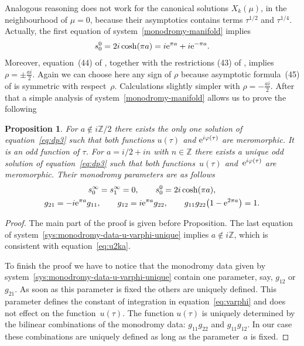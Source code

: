\documentclass[pdftex]{sigma}
\numberwithin{equation}{section}
\newtheorem{Proposition}[Theorem]{Proposition}
 { \theoremstyle{definition}
\newtheorem{Remark}[Theorem]{Remark} }
\begin{document}
Analogous reasoning does not work for the canonical solutions $X_k(\mu)$, in the neighbourhood of $\mu=0$,
because their asymptotics contains terms $\tau^{1/2}$ and $\tau^{1/4}$. Actually, the first equation of
system~\eqref{monodromy-manifold} implies
\begin{gather*}
s_0^0=2i\cosh(\pi a)=i{\rm e}^{\pi a}+i{\rm e}^{-\pi a}.
\end{gather*}
Moreover, equation~(44) of \cite{KV2004}, together with the restrictions (43) of \cite{KV2004}, implies
$\rho=\pm\frac{ai}2$. Again we can choose here any sign of $\rho$ because asymptotic formula~(45) of \cite{KV2004}
is symmetric with respect~$\rho$. Calculations slightly simpler with $\rho=-\frac{ai}2$. After that a simple
analysis of system~\eqref{monodromy-manifold} allows us to prove the following
\begin{Proposition}\label{prop:monodromy-final}
For $a\notin i\mathbb Z/2$ there exists the only one solution of equation~\eqref{eq:dp3} such that both functions
$u(\tau)$ and ${\rm e}^{i\varphi(\tau)}$ are meromorphic. It is an odd function of $\tau$. For $a=i/2+in$ with
$n\in\mathbb Z$ there exists a unique odd solution of equation~\eqref{eq:dp3} such that both functions~$u(\tau)$ and~${\rm e}^{i\varphi(\tau)}$ are meromorphic.
Their monodromy parameters are as follows
\begin{gather}
s_0^\infty=s_1^\infty=0,\qquad s_0^0=2i\cosh(\pi a),\nonumber\\
g_{21}=-i{\rm e}^{\pi a}g_{11},\qquad
g_{12}=i{\rm e}^{\pi a}g_{22},\qquad
g_{11}g_{22}\big(1-{\rm e}^{2\pi a}\big)=1.\label{sys:monodromy-data-u-varphi-unique}
\end{gather}
\end{Proposition}
\begin{proof}The main part of the proof is given before Proposition. The last equation of system~\eqref{sys:monodromy-data-u-varphi-unique} implies $a\notin i\mathbb Z$, which is consistent with
equation~\eqref{eq:u2ka}.

To finish the proof we have to notice that the monodromy data given by system~\eqref{sys:monodromy-data-u-varphi-unique} contain one parameter, say, $g_{12}$ or $g_{21}$.
As soon as this parameter is fixed the others are uniquely defined. This parameter defines the constant of
integration in equation~\eqref{eq:varphi} and does not effect on the function~$u(\tau)$. The function $u(\tau)$
is uniquely determined by the bilinear combinations of the monodromy data: $g_{11}g_{22}$ and $g_{11}g_{12}$.
In our case these combinations are uniquely defined as long as the parameter~$a$ is fixed.
\end{proof}
\end{document}
